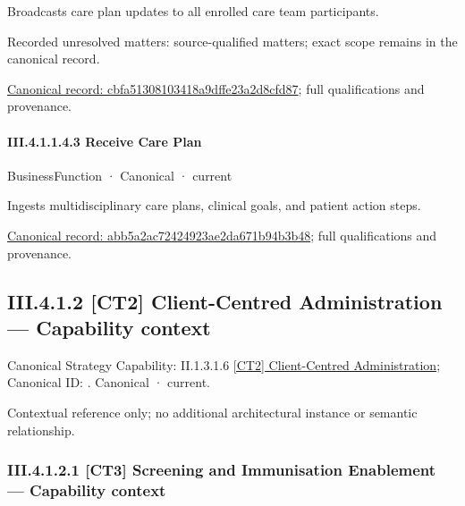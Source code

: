 Broadcasts care plan updates to all enrolled care team participants.


{\small Recorded unresolved matters: source-qualified matters; exact scope remains in the canonical record.}\par
{\footnotesize \href{../../../../continuum/business/business-function/cbfa51308103418a9dffe23a2d8cfd87.md}{Canonical record: cbfa51308103418a9dffe23a2d8cfd87}; full qualifications and provenance.}\par
\paragraph*{III.4.1.1.4.3 Receive Care Plan}
\label{navigation:III.4.1.1.4.3}

\label{element:abb5a2ac72424923ae2da671b94b3b48}
{\small BusinessFunction · Canonical · current}\par

Ingests multidisciplinary care plans, clinical goals, and patient action steps.


{\footnotesize \href{../../../../continuum/business/business-function/abb5a2ac72424923ae2da671b94b3b48.md}{Canonical record: abb5a2ac72424923ae2da671b94b3b48}; full qualifications and provenance.}\par
\subsection*{III.4.1.2 [CT2] Client-Centred Administration — Capability context}
\label{navigation:III.4.1.2}

{\small Canonical Strategy Capability: II.1.3.1.6 \hyperref[element:8752b7a937754b2faa296300c6a48911]{[CT2] Client-Centred Administration}; Canonical ID: \texttt{}. Canonical · current.}\par
Contextual reference only; no additional architectural instance or semantic relationship.\par
\subsubsection*{III.4.1.2.1 [CT3] Screening and Immunisation Enablement — Capability context}
\label{navigation:III.4.1.2.1}

